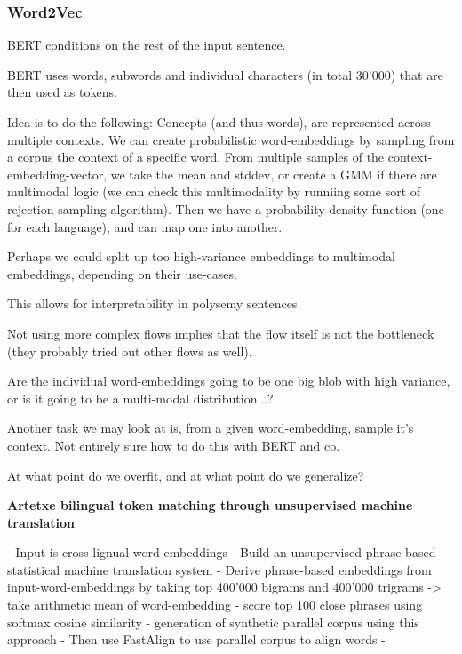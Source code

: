\documentclass[a4paper,12pt,twoside,openright]{report}
\begin{document}
\newpage
\subsubsection{Word2Vec}

BERT conditions on the rest of the input sentence.

BERT uses words, subwords and individual characters (in total 30'000) that are then used as tokens.

Idea is to do the following:
Concepts (and thus words), are represented across multiple contexts.
We can create probabilistic word-embeddings by sampling from a corpus the context of a specific word.
From multiple samples of the context-embedding-vector, we take the mean and stddev, or create a GMM if there are multimodal logic (we can check this multimodality by runniing some sort of rejection sampling algorithm).
Then we have a probability density function (one for each language), and can map one into another.

Perhaps we could split up too high-variance embeddings to multimodal embeddings, depending on their use-cases.

This allows for interpretability in polysemy sentences.

Not using more complex flows implies that the flow itself is not the bottleneck (they probably tried out other flows as well).

Are the individual word-embeddings going to be one big blob with high variance, or is it going to be a multi-modal distribution...?

Another task we may look at is, from a given word-embedding, sample it's context. 
Not entirely sure how to do this with BERT and co.

At what point do we overfit, and at what point do we generalize?


\textbf{Artetxe bilingual token matching through unsupervised machine translation}

- Input is cross-lignual word-embeddings
- Build an unsupervised phrase-based statistical machine translation system
- Derive phrase-based embeddings from input-word-embeddings by taking top 400'000 bigrams and 400'000 trigrams -> take arithmetic mean of word-embedding
- score top 100 close phrases using softmax cosine similarity
- generation of synthetic parallel corpus using this approach
- Then use FastAlign to use parallel corpus to align words
- 

\end{document}
